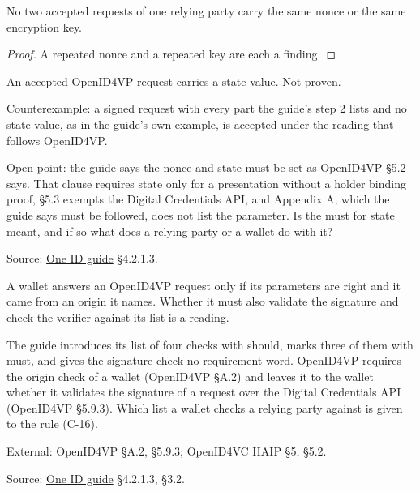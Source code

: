 \begin{theorem}
  \label{thm:openid4vp-requests-fresh}
  No two accepted requests of one relying party carry the same nonce or the
  same encryption key.
\end{theorem}
\begin{proof}
  A repeated nonce and a repeated key are each a finding.
\end{proof}

\begin{theorem}
  \label{thm:openid4vp-state}
  An accepted OpenID4VP request carries a state value.  Not proven.

  Counterexample: a signed request with every part the guide's step 2 lists and
  no state value, as in the guide's own example, is accepted under the reading
  that follows OpenID4VP.

  Open point: the guide says the nonce and state must be set as OpenID4VP §5.2
  says.  That clause requires state only for a presentation without a holder
  binding proof, §5.3 exempts the Digital Credentials API, and Appendix A, which
  the guide says must be followed, does not list the parameter.  Is the must
  for state meant, and if so what does a relying party or a wallet do with it?

  Source: \href{https://standards.atlassian.net/wiki/spaces/OneID/pages/2947416082/Technical+Implementation+Guide}{One ID guide} §4.2.1.3.
\end{theorem}

\begin{definition}
  \label{def:openid4vp-wallet-checks}
  A wallet answers an OpenID4VP request only if its parameters are right and it
  came from an origin it names.  Whether it must also validate the signature
  and check the verifier against its list is a reading.

  The guide introduces its list of four checks with should, marks three of
  them with must, and gives the signature check no requirement word.
  OpenID4VP requires the origin check of a wallet (OpenID4VP §A.2) and leaves
  it to the wallet whether it validates the signature of a request over the
  Digital Credentials API (OpenID4VP §5.9.3).  Which list a wallet checks a
  relying party against is given to the rule (C-16).

  External: OpenID4VP §A.2, §5.9.3; OpenID4VC HAIP §5, §5.2.

  Source: \href{https://standards.atlassian.net/wiki/spaces/OneID/pages/2947416082/Technical+Implementation+Guide}{One ID guide} §4.2.1.3, §3.2.
\end{definition}

